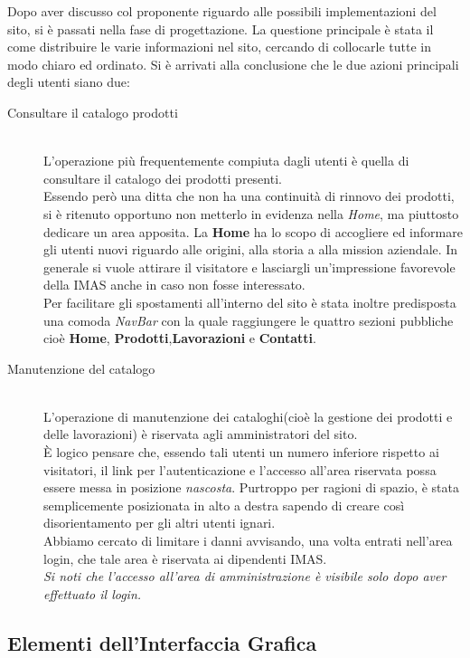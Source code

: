 \documentclass[11pt]{article}
\begin{document}
Dopo aver discusso col proponente riguardo alle possibili implementazioni del sito, si è passati nella fase di progettazione.
La questione principale è stata il come distribuire le varie informazioni nel sito, cercando di collocarle tutte in modo chiaro ed ordinato.
Si è arrivati alla conclusione che le due azioni principali degli utenti siano due:
\begin{description}
	\item [Consultare il catalogo prodotti] \hfill \\
	L'operazione più frequentemente compiuta dagli utenti è quella di consultare il catalogo dei prodotti presenti.
	\\
	Essendo però una ditta che non ha una continuità di rinnovo dei prodotti, si è ritenuto opportuno non metterlo in evidenza nella \textit{Home}, ma piuttosto dedicare un area apposita.
	La \textbf{Home} ha lo scopo di accogliere ed informare gli utenti nuovi riguardo alle origini, alla storia a alla mission aziendale. In generale si vuole attirare il visitatore e lasciargli un'impressione favorevole della IMAS anche in caso non fosse interessato.\\
	Per facilitare gli spostamenti all'interno del sito è stata inoltre predisposta una comoda \textit{NavBar} con la quale raggiungere le quattro sezioni pubbliche cioè \textbf{Home}, \textbf{Prodotti},\textbf{Lavorazioni} e \textbf{Contatti}.

	\item [Manutenzione del catalogo] \hfill \\
	L'operazione di manutenzione dei cataloghi(cioè la gestione dei prodotti e delle lavorazioni) è riservata agli amministratori del sito.\\
	 È logico pensare che, essendo tali utenti un numero inferiore rispetto ai visitatori, il link per l'autenticazione e l'accesso all'area riservata possa essere messa in posizione \textit{nascosta}. Purtroppo per ragioni di spazio, è stata semplicemente posizionata in alto a destra sapendo di creare così disorientamento per gli altri utenti ignari.\\
	 Abbiamo cercato di limitare i danni avvisando,  una volta entrati nell'area login, che tale area è riservata ai dipendenti IMAS.\\
	  \textit{Si noti che l'accesso all'area di amministrazione è visibile solo dopo aver effettuato il login.}
\end{description}

\subsection{Elementi dell'Interfaccia Grafica}
\end{document}
